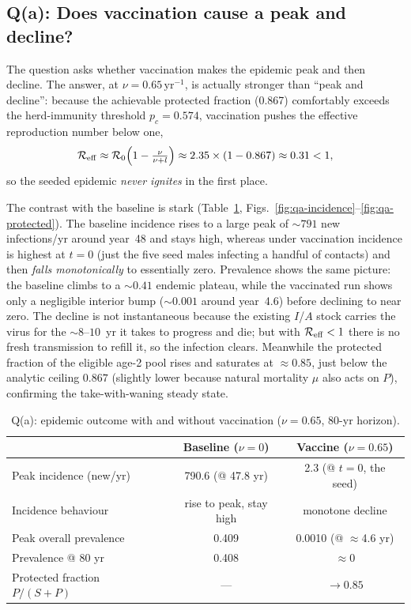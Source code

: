 \subsection{Q(a): Does vaccination cause a peak and decline?}

The question asks whether vaccination makes the epidemic peak and then decline. The
answer, at $\nu=0.65\,\text{yr}^{-1}$, is actually stronger than ``peak and
decline'': because the achievable protected fraction (0.867) comfortably exceeds the
herd-immunity threshold $p_c=0.574$, vaccination pushes the effective reproduction
number below one,
\begin{equation}
\mathcal{R}_{\mathrm{eff}} \approx \mathcal{R}_0\Bigl(1-\tfrac{\nu}{\nu+l}\Bigr)
       \approx 2.35\times(1-0.867) \approx 0.31 < 1,
\end{equation}
so the seeded epidemic \emph{never ignites} in the first place.

The contrast with the baseline is stark (Table~\ref{tab:qa},
Figs.~\ref{fig:qa-incidence}--\ref{fig:qa-protected}). The baseline incidence rises
to a large peak of $\sim\!791$ new infections/yr around year~48 and stays high,
whereas under vaccination incidence is highest at $t=0$ (just the five seed males
infecting a handful of contacts) and then \emph{falls monotonically} to essentially
zero. Prevalence shows the same picture: the baseline climbs to a $\sim\!0.41$
endemic plateau, while the vaccinated run shows only a negligible interior bump
($\sim\!0.001$ around year~4.6) before declining to near zero. The decline is not
instantaneous because the existing $I$/$A$ stock carries the virus for the $\sim\!8$--$10$~yr
it takes to progress and die; but with $\mathcal{R}_{\mathrm{eff}}<1$ there is no fresh transmission to
refill it, so the infection clears. Meanwhile the protected fraction of the eligible
age-2 pool rises and saturates at $\approx0.85$, just below the analytic ceiling
$0.867$ (slightly lower because natural mortality $\mu$ also acts on $P$),
confirming the take-with-waning steady state.

\begin{table}[t]
\centering
\caption{Q(a): epidemic outcome with and without vaccination ($\nu=0.65$,
80-yr horizon).}
\label{tab:qa}
\begin{tabular}{lcc}
\toprule
 & Baseline ($\nu=0$) & Vaccine ($\nu=0.65$) \\
\midrule
Peak incidence (new/yr)      & 790.6 (@ 47.8 yr) & 2.3 (@ $t=0$, the seed) \\
Incidence behaviour          & rise to peak, stay high & monotone decline \\
Peak overall prevalence      & 0.409 & 0.0010 (@ $\approx$4.6 yr) \\
Prevalence @ 80 yr           & 0.408 & $\approx 0$ \\
Protected fraction $P/(S+P)$ & --- & $\to 0.85$ \\
\bottomrule
\end{tabular}
\end{table}

